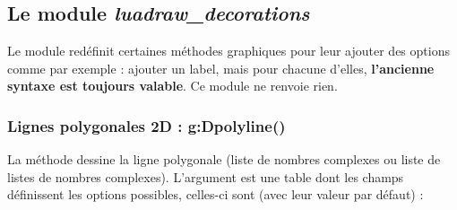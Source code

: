 \subsection{Le module \emph{luadraw\_decorations}}

Le module  redéfinit certaines méthodes graphiques pour leur ajouter des options comme par exemple : ajouter un label, mais pour chacune d'elles, \textbf{l'ancienne syntaxe est toujours valable}. Ce module ne renvoie rien.

\subsubsection{Lignes polygonales 2D : g:Dpolyline()}

La méthode  dessine la ligne polygonale  (liste de nombres complexes ou liste de listes de nombres complexes). L'argument  est une table dont les champs définissent les options possibles, celles-ci sont (avec leur valeur par défaut) :

